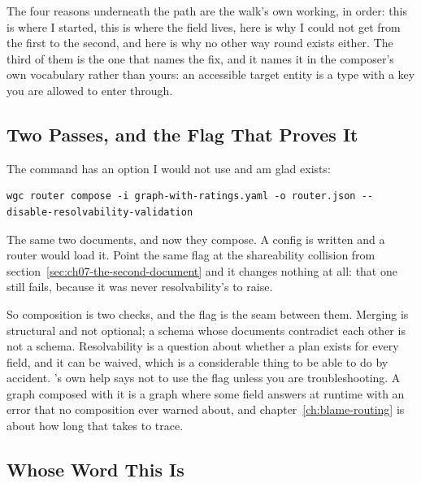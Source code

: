%
The four reasons underneath the path are the walk's own working, in order: this
is where I started, this is where the field lives, here is why I could not get
from the first to the second, and here is why no other way round exists either.
The third of them is the one that names the fix, and it names it in the
composer's own vocabulary rather than yours: an accessible target entity is a
type with a key you are allowed to enter through.

\subsection{Two Passes, and the Flag That Proves It}

%
The command has an option I would not use and am glad exists:

\begin{verbatim}
wgc router compose -i graph-with-ratings.yaml -o router.json --disable-resolvability-validation
\end{verbatim}

%
The same two documents, and now they compose. A config is written and a router
would load it. Point the same flag at the shareability collision from
section~\ref{sec:ch07-the-second-document} and it changes nothing at all: that
one still fails, because it was never resolvability's to raise.

%
So composition is two checks, and the flag is the seam between them. Merging is
structural and not optional; a schema whose documents contradict each other is
not a schema. Resolvability is a question about whether a plan exists for every
field, and it can be waived, which is a considerable thing to be able to do by
accident. 's own help says not to use the flag unless you are
troubleshooting. A graph composed with it is a graph where some field answers at
runtime with an error that no composition ever warned about, and
chapter~\ref{ch:blame-routing} is about how long that takes to trace.

\subsection{Whose Word This Is}

